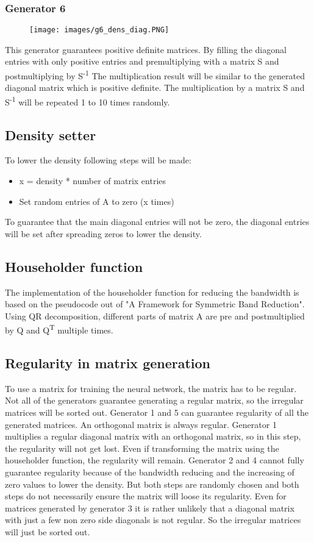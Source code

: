 \documentclass[parskip=full]{scrartcl}
\begin{document}
\subsubsection{Generator 6}
\begin{figure}[h!]
	\texttt{[image: images/g6\_dens\_diag.PNG]}
\end{figure}
\newpage
This generator guarantees positive definite matrices.
By filling the diagonal entries with only positive entries and premultiplying with a matrix S and postmultiplying by S\textsuperscript{-1}
The multiplication result will be similar to the generated diagonal matrix which is positive definite. The multiplication by a matrix S and S\textsuperscript{-1} will be repeated 1 to 10 times randomly.

\subsection{Density setter}
To lower the density following steps will be made:
\begin{itemize}
	\item x = density * number of matrix entries
	\item Set random entries of A to zero (x times)
\end{itemize}
To guarantee that the main diagonal entries will not be zero, the diagonal entries will be set after spreading zeros to lower the density.


\subsection{Householder function}
The implementation of the householder function for reducing the bandwidth is based on the pseudocode out of "A Framework for Symmetric Band Reduction"\cite{Householder}. 
Using QR decomposition, different parts of matrix A are pre and postmultiplied by Q and Q\textsuperscript{T} multiple times.

\subsection{Regularity in matrix generation}
To use a matrix for training the neural network, the matrix has to be regular.
Not all of the generators guarantee generating a regular matrix, so the irregular matrices will be sorted out.
Generator 1 and 5 can guarantee regularity of all the generated matrices. An orthogonal matrix is always regular. 
Generator 1 multiplies a regular diagonal matrix with an orthogonal matrix, so in this step, the regularity will not get lost.
Even if transforming the matrix using the householder function, the regularity will remain.
Generator 2 and 4 cannot fully guarantee regularity because of the bandwidth reducing and the increasing of zero values to lower the density.
But both steps are randomly chosen and both steps do not necessarily ensure the matrix will loose its regularity.
Even for matrices generated by generator 3 it is rather unlikely that a diagonal matrix with just a few non zero side diagonals is not regular.
So the irregular matrices will just be sorted out.
\end{document}
